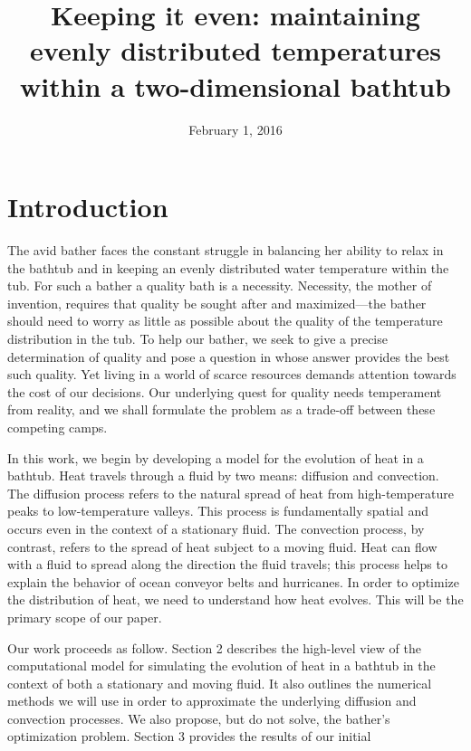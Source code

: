 \documentclass[12pt]{amsart}
\title{Keeping it even: maintaining evenly distributed temperatures within a
two-dimensional bathtub}
\date{February 1, 2016}
\begin{document}
\maketitle

\thispagestyle{fancy}
\tableofcontents

\begin{abstract}

\end{abstract}

\section{Introduction}

The avid bather faces the constant struggle in balancing her ability to relax in
the bathtub and in keeping an evenly distributed water temperature within the
tub. For such a bather a quality bath is a necessity. Necessity, the mother of
invention, requires that quality be sought after and maximized---the bather
should need to worry as little as possible about the quality of the temperature
distribution in the tub. To help our bather, we seek to give a precise
determination of quality and pose a question in whose answer provides the best
such quality. Yet living in a world of scarce resources demands attention
towards the cost of our decisions. Our underlying quest for quality needs
temperament from reality, and we shall formulate the problem as a trade-off
between these competing camps.

In this work, we begin by developing a model for the evolution of heat in a
bathtub. Heat travels through a fluid by two means: diffusion and convection.
The diffusion process refers to the natural spread of heat from high-temperature
peaks to low-temperature valleys. This process is fundamentally spatial and
occurs even in the context of a stationary fluid. The convection process, by
contrast, refers to the spread of heat subject to a moving fluid. Heat can flow
with a fluid to spread along the direction the fluid travels; this process helps
to explain the behavior of ocean conveyor belts and hurricanes. In order to
optimize the distribution of heat, we need to understand how heat evolves. This
will be the primary scope of our paper.

Our work proceeds as follow. Section 2 describes the high-level view of the
computational model for simulating the evolution of heat in a bathtub in the
context of both a stationary and moving fluid. It also outlines the numerical
methods we will use in order to approximate the underlying diffusion and
convection processes. We also propose, but do not solve, the bather's
optimization problem. Section 3 provides the results of our initial 
\end{document}

